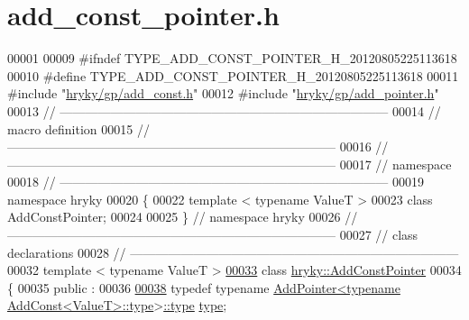 \hypertarget{add__const__pointer_8h_source}{\section{add\-\_\-const\-\_\-pointer.\-h}
}

\begin{DoxyCode}
00001 
00009 \textcolor{preprocessor}{#ifndef TYPE\_ADD\_CONST\_POINTER\_H\_20120805225113618}
00010 \textcolor{preprocessor}{}\textcolor{preprocessor}{#define TYPE\_ADD\_CONST\_POINTER\_H\_20120805225113618}
00011 \textcolor{preprocessor}{}\textcolor{preprocessor}{#include "\hyperlink{add__const_8h}{hryky/gp/add_const.h}"}
00012 \textcolor{preprocessor}{#include "\hyperlink{add__pointer_8h}{hryky/gp/add_pointer.h}"}
00013 \textcolor{comment}{//
      ------------------------------------------------------------------------------}
00014 \textcolor{comment}{// macro definition}
00015 \textcolor{comment}{//
      ------------------------------------------------------------------------------}
00016 \textcolor{comment}{//
      ------------------------------------------------------------------------------}
00017 \textcolor{comment}{// namespace}
00018 \textcolor{comment}{//
      ------------------------------------------------------------------------------}
00019 \textcolor{keyword}{namespace }hryky
00020 \{
00022     \textcolor{keyword}{template} < \textcolor{keyword}{typename} ValueT >
00023     \textcolor{keyword}{class }AddConstPointer;
00024 
00025 \} \textcolor{comment}{// namespace hryky}
00026 \textcolor{comment}{//
      ------------------------------------------------------------------------------}
00027 \textcolor{comment}{// class declarations}
00028 \textcolor{comment}{//
      ------------------------------------------------------------------------------}
00032 \textcolor{comment}{}\textcolor{keyword}{template} < \textcolor{keyword}{typename} ValueT >
\hypertarget{add__const__pointer_8h_source_l00033}{}\hyperlink{classhryky_1_1_add_const_pointer}{00033} \textcolor{keyword}{class }\hyperlink{classhryky_1_1_add_const_pointer}{hryky::AddConstPointer}
00034 \{
00035 \textcolor{keyword}{public} :
00036 
\hypertarget{add__const__pointer_8h_source_l00038}{}\hyperlink{classhryky_1_1_add_const_pointer_a62e5c44fefac145f6bd2460e4c8d0ba2}{00038}     \textcolor{keyword}{typedef} \textcolor{keyword}{typename} \hyperlink{classhryky_1_1_add_pointer}{AddPointer<typename AddConst<ValueT>::type}>\hyperlink{classhryky_1_1_add_const_pointer_a62e5c44fefac145f6bd2460e4c8d0ba2}{::type} \hyperlink{classhryky_1_1_add_const_pointer_a62e5c44fefac145f6bd2460e4c8d0ba2}{type};

\end{DoxyCode}
